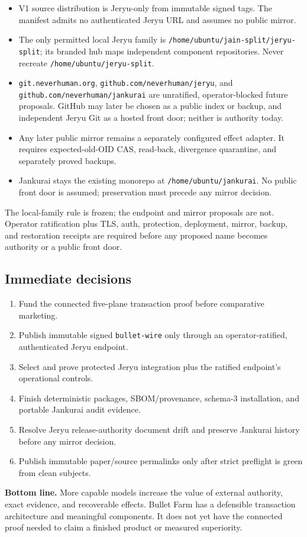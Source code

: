 \documentclass[11pt,letterpaper]{article}
\newcommand{\statusbox}[1]{\colorbox{blue!8}{\parbox{.96\linewidth}{#1}}}
\begin{document}
\begin{itemize}
\item V1 source distribution is Jeryu-only from immutable signed tags. The
manifest admits no authenticated Jeryu URL and assumes no public mirror.
\item The only permitted local Jeryu family is
\texttt{/home/ubuntu/jain-split/jeryu-split}; its branded hub maps independent
component repositories. Never recreate \texttt{/home/ubuntu/jeryu-split}.
\item \texttt{git.neverhuman.org}, \texttt{github.com/neverhuman/jeryu}, and
\texttt{github.com/neverhuman/jankurai} are unratified, operator-blocked future
proposals. GitHub may later be chosen as a public index or backup, and
independent Jeryu Git as a hosted front door; neither is authority today.
\item Any later public mirror remains a separately configured effect adapter.
It requires expected-old-OID CAS, read-back, divergence quarantine, and
separately proved backups.
\item Jankurai stays the existing monorepo at \texttt{/home/ubuntu/jankurai}.
No public front door is assumed; preservation must precede any mirror decision.
\end{itemize}

The local-family rule is frozen; the endpoint and mirror proposals are not.
Operator ratification plus TLS, auth, protection, deployment, mirror, backup,
and restoration receipts are required before any proposed name becomes
authority or a public front door.

\subsection*{Immediate decisions}

\begin{enumerate}
\item Fund the connected five-plane transaction proof before comparative marketing.
\item Publish immutable signed \texttt{bullet-wire} only through an operator-ratified, authenticated Jeryu endpoint.
\item Select and prove protected Jeryu integration plus the ratified endpoint's operational controls.
\item Finish deterministic packages, SBOM/provenance, schema-3 installation, and portable Jankurai audit evidence.
\item Resolve Jeryu release-authority document drift and preserve Jankurai history before any mirror decision.
\item Publish immutable paper/source permalinks only after strict preflight is green from clean subjects.
\end{enumerate}

\vfill
\statusbox{\textbf{Bottom line.} More capable models increase the value of
external authority, exact evidence, and recoverable effects. Bullet Farm has a
defensible transaction architecture and meaningful components. It does not yet
have the connected proof needed to claim a finished product or measured
superiority.}
\end{document}
